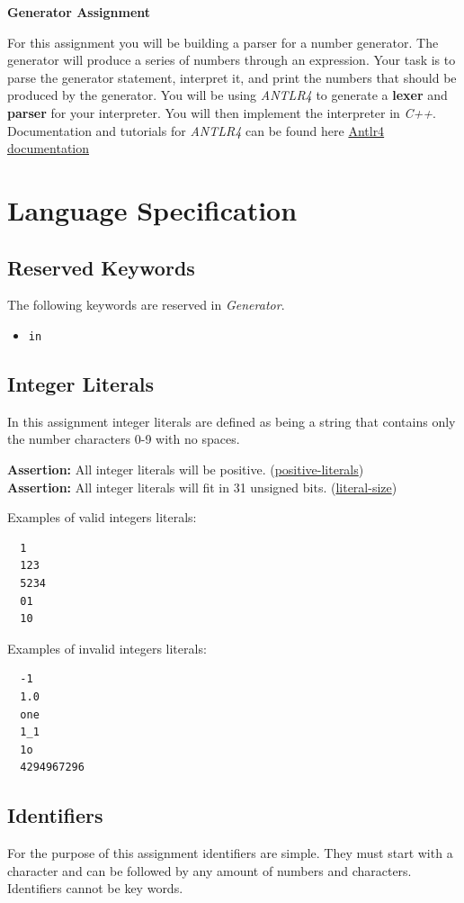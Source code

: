 \documentclass{article}
\newcommand{\code}[1]{\texttt{\textmd{#1}}}
\newcommand{\assertion}[2]{\textbf{Assertion: }#1 (\hyperlink{#2}{#2})}
\begin{document}
\ifpdf
  \LARGE
  \textbf{Generator Assignment}
  \normalsize
\fi

For this assignment you will be building a parser for a number generator. The generator will
produce a series of numbers through an expression. Your task is to parse the generator statement,
interpret it, and print the numbers that should be produced by the generator. You will be using
\textit{ANTLR4} to generate a \textbf{lexer} and \textbf{parser} for your interpreter. You will
then implement the interpreter in \textit{C++}. Documentation and tutorials for \textit{ANTLR4} can
be found here \href{https://github.com/antlr/antlr4/blob/master/doc/index.md}
{Antlr4 documentation}

\section{Language Specification}
\subsection{Reserved Keywords}
The following keywords are reserved in \textit{Generator}.
\begin{itemize}
  \item \code{in}
\end{itemize}

\subsection{Integer Literals}
In this assignment integer literals are defined as being a string that contains only the number
characters 0-9 with no spaces.

\assertion{All integer literals will be positive.}{positive-literals}\\
\assertion{All integer literals will fit in 31 unsigned bits.}{literal-size}

Examples of valid integers literals:
\begin{lstlisting}
  1
  123
  5234
  01
  10
\end{lstlisting}

Examples of invalid integers literals:
\begin{lstlisting}
  -1
  1.0
  one
  1_1
  1o
  4294967296
\end{lstlisting}

\subsection{Identifiers}
For the purpose of this assignment identifiers are simple. They must start with a character and
can be followed by any amount of numbers and characters. Identifiers cannot be key words.
\end{document}

